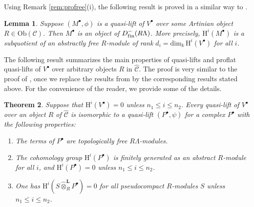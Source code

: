 \documentclass{amsart}
\theoremstyle{plain}
\newtheorem{thm}{Theorem}[subsection]
\newtheorem{lemma}[thm]{Lemma}
\theoremstyle{definition}
\theoremstyle{remark}
\begin{document}
Using Remark \ref{rem:profree}(i), the following result is proved in a similar way to \cite[Lemma 3.1]{bcderived}.

\begin{lemma}
\label{lem:lemma3.1}
Suppose $(M^\bullet,\phi)$ is a quasi-lift of $V^\bullet$ over some Artinian object
$R \in \mathrm{Ob}(\mathcal{C})$. Then $M^\bullet$ is an object of $D^{-}_{\mathrm{f\/in}}(R\Lambda)$. 
More precisely, ${\mathrm{H}}^i(M^\bullet)$ is a subquotient of  an abstractly
free $R$-module of rank $d_i=\mathrm{dim}_k\,{\mathrm{H}}^i(V^\bullet)$ for all $i$.
\end{lemma}

The following result  summarizes the main properties of quasi-lifts and proflat quasi-lifts
of $V^\bullet$ over arbitrary objects $R$ in $\hat{\mathcal{C}}$. 
The proof is very similar to the proof of \cite[Thm. 2.10]{obstructions},
once we replace the results from \cite{bcderived} by the corresponding results stated above.
For the convenience of the reader, we provide some of the details.

\begin{thm} 
\label{thm:derivedresult}  
Suppose that ${\mathrm{H}}^i(V^\bullet) = 0$ unless $n_1 \le i \le n_2$.  Every quasi-lift of $V^\bullet$ over 
an object $R$ of $\hat{\mathcal{C}}$ is isomorphic to a quasi-lift $(P^\bullet, \psi)$ for
a complex $P^\bullet$ with the following properties:
\begin{enumerate}
\item[(i)] The terms of $P^\bullet$ are topologically free $R\Lambda$-modules.
\item[(ii)] The cohomology group ${\mathrm{H}}^i(P^\bullet)$ is finitely generated 
as an abstract $R$-module for all $i$, and ${\mathrm{H}}^i(P^\bullet) = 0$ unless $n_1 \le i \le n_2$. 
\item[(iii)]   One has ${\mathrm{H}}^i(S\hat{\otimes}^{\mathbf{L}}_RP^\bullet)=0$  for all pseudocompact $R$-modules 
$S$ unless $n_1 \le i \le n_2$.
\end{enumerate}
\end{thm}
\end{document}
